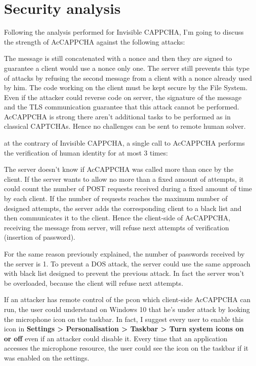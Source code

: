\section{Security analysis}\label{Results:security}
Following the analysis performed for Invisible CAPPCHA\cite{Invisible_CAPPCHA}, I'm going to discuss the strength of AcCAPPCHA against the following attacks:
\begin{itemize}
{The message is still concatenated with a nonce and then they are signed to guarantee a client would use a nonce only one. The server still prevents this type of attacks by refusing the second message from a client with a nonce already used by him.}
{The code working on the client must be kept secure by the File System. Even if the attacker could reverse code on server, the signature of the message and the TLS communication guarantee that this attack cannot be performed.}
{AcCAPPCHA is strong there aren't additional tasks to be performed as in classical CAPTCHAs. Hence no challenges can be sent to remote human solver.}
{at the contrary of Invisible CAPPCHA, a single call to AcCAPPCHA performs the verification of human identity for at most 3 times:
\begin{itemize}
\end{itemize}
The server doesn't know if AcCAPPCHA was called more than once by the client. If the server wants to allow no more than a fixed amount of attempts, it could count the number of POST requests received during a fixed amount of time by each client. If the number of requests reaches the maximum number of designed attempts, the server adds the corresponding client to a black list and then communicates it to the client. Hence the client-side of AcCAPPCHA, receiving the message from server, will refuse next attempts of verification (insertion of password).
}
{For the same reason previously explained, the number of passwords received by the server is 1. To prevent a DOS attack, the server could use the same approach with black list designed to prevent the previous attack. In fact the server won't be overloaded, because the client will refuse next attempts.}
\end{itemize}
If an attacker has remote control of the pcon which client-side AcCAPPCHA can run, the user could understand on Windows 10 that he's under attack by looking the microphone icon on the taskbar. In fact, I suggest every user to enable this icon in \textbf{Settings > Personalisation > Taskbar > Turn system icons on or off} even if an attacker could disable it. Every time that an application accesses the microphone resource, the user could see the icon on the taskbar if it was enabled on the settings.   